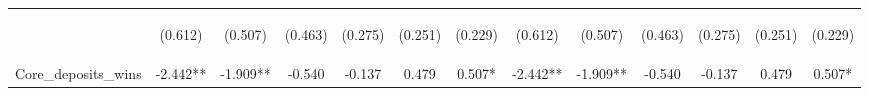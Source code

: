 \documentclass[]{article}
\begin{document}
\begin{center}
\begin{tabular}{lcccccccccccc}
\vspace{4pt} & \begin{footnotesize}(0.612)\end{footnotesize} & \begin{footnotesize}(0.507)\end{footnotesize} & \begin{footnotesize}(0.463)\end{footnotesize} & \begin{footnotesize}(0.275)\end{footnotesize} & \begin{footnotesize}(0.251)\end{footnotesize} & \begin{footnotesize}(0.229)\end{footnotesize} & \begin{footnotesize}(0.612)\end{footnotesize} & \begin{footnotesize}(0.507)\end{footnotesize} & \begin{footnotesize}(0.463)\end{footnotesize} & \begin{footnotesize}(0.275)\end{footnotesize} & \begin{footnotesize}(0.251)\end{footnotesize} & \begin{footnotesize}(0.229)\end{footnotesize} \\
Core\_deposits\_wins & -2.442** & -1.909** & -0.540 & -0.137 & 0.479 & 0.507* & -2.442** & -1.909** & -0.540 & -0.137 & 0.479 & 0.507* \\

\end{tabular}
\end{center}
\end{document}
